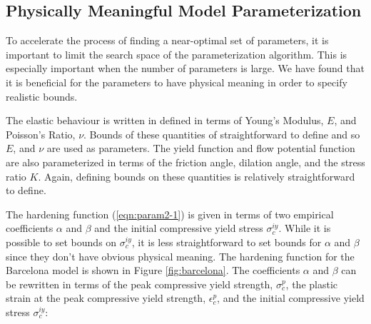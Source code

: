 \subsection{Physically Meaningful Model Parameterization}
To accelerate the process of finding a near-optimal set of parameters, it is important to limit the search space of the parameterization algorithm. This is especially important when the number of parameters is large. We have found that it is beneficial for the parameters to have physical meaning in order to specify realistic bounds.

The elastic behaviour is written in defined in terms of Young's Modulus, $E$, and Poisson's Ratio, $\nu$. Bounds of these quantities of straightforward to define and so $E$, and $\nu$ are used as parameters. The yield function and flow potential function are also parameterized in terms of the friction angle, dilation angle, and the stress ratio $K$. Again, defining bounds on these quantities is relatively straightforward to define.

The hardening function (\ref{eqn:param2-1}) is given in terms of two empirical coefficients $\alpha$ and $\beta$ and the initial compressive yield stress $\sigma_c^{iy}$.  While it is possible to set bounds on $\sigma_c^{iy}$, it is less straightforward to set bounds for $\alpha$ and $\beta$ since they don't have obvious physical meaning. The hardening function for the Barcelona model is shown in Figure \ref{fig:barcelona}. The coefficients $\alpha$ and $\beta$ can be rewritten in terms of the peak compressive yield strength, $\sigma_{c}^{p}$, the plastic strain at the peak compressive yield strength, $\epsilon_c^{p}$, and the initial compressive yield stress $\sigma_c^{iy}$:

